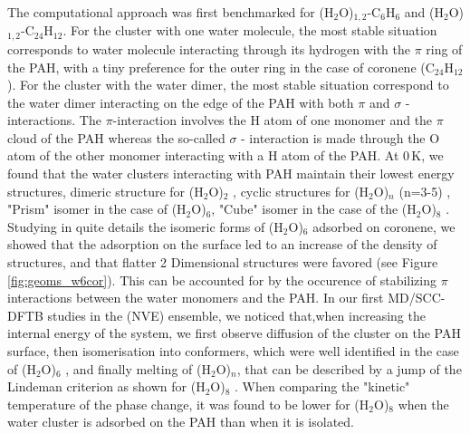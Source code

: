 \documentclass[]{interact}
\theoremstyle{plain}%
\theoremstyle{definition}
\theoremstyle{remark}
\begin{document}
The computational approach was first benchmarked for  (H$_2$O)$_{1,2}$-C$_6$H$_6$ and   (H$_2$O)$_{1,2}$-C$_{24}$H$_{12}$\cite{SimonPCCP2012}.  For the cluster with one water molecule, the most stable situation corresponds to water molecule interacting through its hydrogen with the $\pi$ ring of the PAH, with a tiny preference for the outer ring in the case of coronene (C$_{24}$H$_{12}$). For the cluster with the water dimer, the most stable situation correspond  to the water dimer interacting on the edge of the PAH with  both $\pi$ and $\sigma$  -interactions. The $\pi$-interaction involves  the H atom of one monomer and the $\pi$ cloud of the PAH whereas the so-called $\sigma$ - interaction is made through the O atom of the other monomer interacting with a H atom of the PAH. 
At 0\,K, we found that the water clusters interacting with PAH maintain their lowest energy structures, dimeric structure for (H$_2$O)$_{2}$ \cite{SimonPCCP2012}, cyclic structures for (H$_2$O)$_n$ (n=3-5)  \cite{SimonJCP2013},  "Prism" isomer in the case of (H$_2$O)$_6$, "Cube" isomer in the case of the (H$_2$O)$_8$ \cite{Oliveira2015}. Studying in quite details the isomeric forms of (H$_2$O)$_6$ adsorbed on coronene, we showed that the adsorption on the surface led to an increase of the density of structures, and that flatter 2 Dimensional structures were favored (see Figure \ref{fig:geoms_w6cor}). This can be accounted for by the occurence of stabilizing $\pi$ interactions between the water monomers and the PAH.
In our first MD/SCC-DFTB studies in the (NVE) ensemble, we noticed that,when increasing the internal energy of the system, we first observe diffusion of the cluster on the PAH surface, then isomerisation into conformers, which were well identified in the case of (H$_2$O)$_6$ \cite{SimonJCP2013}, and finally melting of  (H$_2$O)$_n$, that can be described by a jump of the Lindeman criterion as shown for (H$_2$O)$_8$  \cite{SimonCOMP2013}. When comparing the "kinetic" temperature of the phase change, it was found to be lower for (H$_2$O)$_8$ when the water cluster is adsorbed on the PAH than when it is isolated.
	
\end{document}
